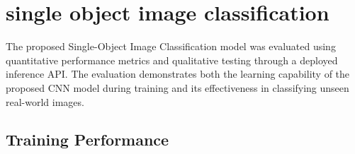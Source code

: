 





% 

\section{single object image classification}
\label{chap:testing-results}

The proposed Single-Object Image Classification model was evaluated using quantitative performance metrics and qualitative testing through a deployed inference API. The evaluation demonstrates both the learning capability of the proposed CNN model during training and its effectiveness in classifying unseen real-world images.


\subsection{Training Performance}

